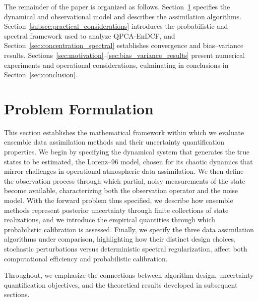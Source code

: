 \documentclass[11pt,a4paper]{article}
\begin{document}
The remainder of the paper is organized as follows. Section~\ref{sec:problem} specifies the dynamical and observational model and describes the assimilation algorithms. Section~\ref{subsec:practical_considerations} introduces the probabilistic and spectral framework used to analyze QPCA-EnDCF, and Section~\ref{sec:concentration_spectral} establishes convergence and bias--variance results. Sections~\ref{sec:motivation}--\ref{sec:bias_variance_results} present numerical experiments and operational considerations, culminating in conclusions in Section~\ref{sec:conclusion}.

\FloatBarrier







\section{Problem Formulation}\label{sec:problem}

This section establishes the mathematical framework within which we evaluate ensemble data assimilation methods and their uncertainty quantification properties. We begin by specifying the dynamical system that generates the true states to be estimated, the Lorenz–96 model, chosen for its chaotic dynamics that mirror challenges in operational atmospheric data assimilation. We then define the observation process through which partial, noisy measurements of the state become available, characterizing both the observation operator and the noise model. With the forward problem thus specified, we describe how ensemble methods represent posterior uncertainty through finite collections of state realizations, and we introduce the empirical quantities through which probabilistic calibration is assessed.
Finally, we specify the three data assimilation algorithms under comparison, highlighting how their distinct design choices, stochastic perturbations versus deterministic spectral regularization, affect both computational efficiency and probabilistic calibration.

 Throughout, we emphasize the connections between algorithm design, uncertainty quantification objectives, and the theoretical results developed in subsequent sections.
\end{document}
